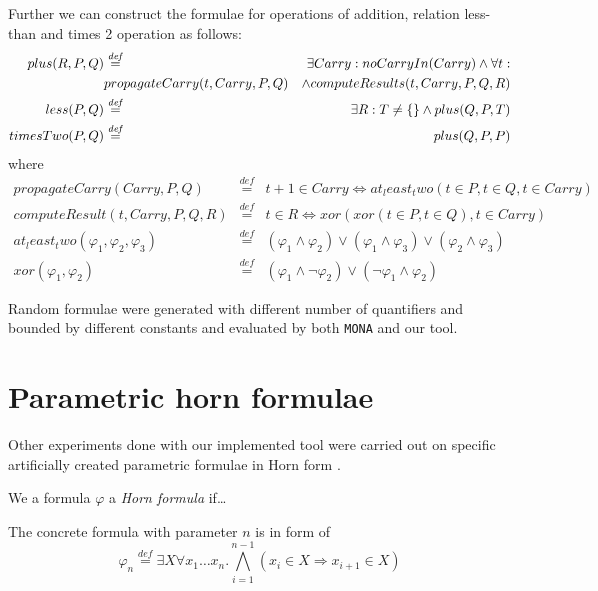 Further we can construct the formulae for operations of addition, relation
less-than and times 2 operation as follows:
\begin{eqnarray}
 plus(R, P, Q) & \overset{\mathit{def}}{=} & \exists Carry:
 noCarryIn(Carry) \wedge \forall t:\\
 &  propagateCarry(t, Carry, P, Q) & \wedge computeResults(t,
 Carry, P, Q, R)\\
 less(P, Q) & \overset{\mathit{def}}{=} &\exists R: T \neq \{\empty\} \wedge
 plus(Q, P, T)\\
 timesTwo(P, Q) & \overset{\mathit{def}}{=} & plus(Q, P, P) 
\end{eqnarray}
where
\begin{eqnarray}
 propagateCarry(Carry, P, Q) & \overset{\mathit{def}}{=} & t + 1 \in Carry
 \Leftrightarrow at_least_two(t \in P, t \in Q, t \in Carry)\\
 computeResult(t, Carry, P, Q, R) & \overset{\mathit{def}}{=} & t \in R
 \Leftrightarrow xor(xor(t \in P, t \in Q), t \in Carry)\\
 at_least_two(\varphi_1, \varphi_2, \varphi_3) & \overset{\mathit{def}}{=} &
 (\varphi_1 \wedge \varphi_2) \vee (\varphi_1 \wedge \varphi_3) \vee (\varphi_2
 \wedge \varphi_3)\\
 xor(\varphi_1, \varphi_2) & \overset{\mathit{def}}{=} & (\varphi_1 \wedge
 \neg\varphi_2) \vee (\neg\varphi_1 \wedge \varphi_2)
\end{eqnarray}

Random formulae were generated with different number of quantifiers and bounded
by different constants and evaluated by both \texttt{MONA} and our tool. 

\fi

\section{Parametric horn formulae}

Other experiments done with our implemented tool were carried out on specific
artificially created parametric formulae in Horn form \cite{horn}. 

\begin{defz}
We a formula $\varphi$ a \emph{Horn formula} if\ldots
\end{defz}

The concrete formula with parameter $n$ is in form of
\begin{equation}
 \varphi_n \overset{\mathit{def}}{=} \exists X\forall x_1\ldots x_n.
 \bigwedge_{i = 1}^{n-1} (x_i \in X \Rightarrow x_{i+1} \in X)
\end{equation}

